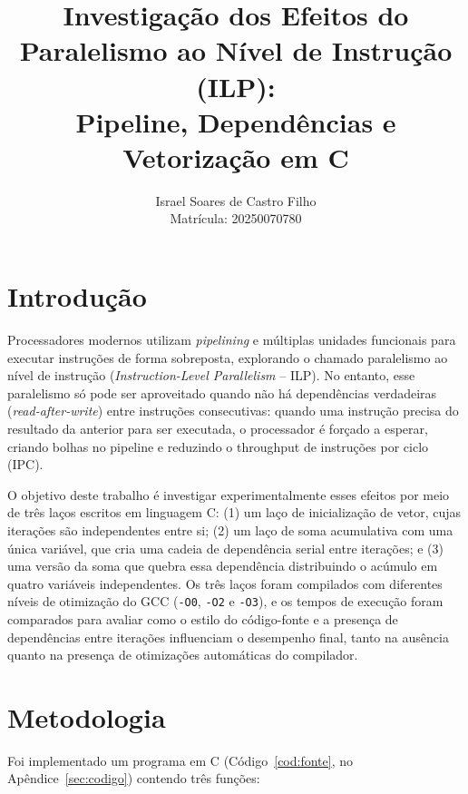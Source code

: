 \documentclass[a4paper,12pt]{article}
\title{Investigação dos Efeitos do Paralelismo ao Nível de Instrução (ILP): \\
Pipeline, Dependências e Vetorização em C}
\author{Israel Soares de Castro Filho \\ Matrícula: 20250070780}
\date{}
\begin{document}
\maketitle

\section{Introdução}

Processadores modernos utilizam \textit{pipelining} e múltiplas unidades funcionais para executar instruções de forma sobreposta, explorando o chamado paralelismo ao nível de instrução (\textit{Instruction-Level Parallelism} -- ILP). No entanto, esse paralelismo só pode ser aproveitado quando não há dependências verdadeiras (\textit{read-after-write}) entre instruções consecutivas: quando uma instrução precisa do resultado da anterior para ser executada, o processador é forçado a esperar, criando bolhas no pipeline e reduzindo o throughput de instruções por ciclo (IPC).

O objetivo deste trabalho é investigar experimentalmente esses efeitos por meio de três laços escritos em linguagem C: (1) um laço de inicialização de vetor, cujas iterações são independentes entre si; (2) um laço de soma acumulativa com uma única variável, que cria uma cadeia de dependência serial entre iterações; e (3) uma versão da soma que quebra essa dependência distribuindo o acúmulo em quatro variáveis independentes. Os três laços foram compilados com diferentes níveis de otimização do GCC (\texttt{-O0}, \texttt{-O2} e \texttt{-O3}), e os tempos de execução foram comparados para avaliar como o estilo do código-fonte e a presença de dependências entre iterações influenciam o desempenho final, tanto na ausência quanto na presença de otimizações automáticas do compilador.

\section{Metodologia}

Foi implementado um programa em C (Código~\ref{cod:fonte}, no Apêndice~\ref{sec:codigo}) contendo três funções:
\end{document}
